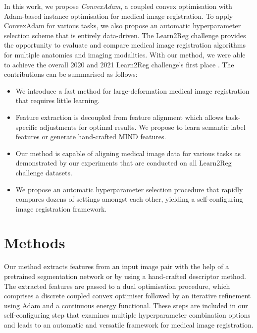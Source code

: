 In this work, we propose \textit{ConvexAdam}, a coupled convex optimisation with Adam-based instance optimisation for medical image registration. To apply ConvexAdam for various tasks, we also propose an automatic hyperparameter selection scheme that is entirely data-driven. The Learn2Reg challenge \citep{hering2022learn2reg} provides the opportunity to evaluate and compare medical image registration algorithms for multiple anatomies and imaging modalities. With our method, we were able to achieve the overall 2020 and 2021 Learn2Reg challenge's first place \citep{siebert2021fast,hering2022learn2reg}. The contributions can be summarised as follows:
\begin{itemize}
    \item We introduce a fast method for large-deformation medical image registration that requires little learning.
    \item Feature extraction is decoupled from feature alignment which allows task-specific adjustments for optimal results. We propose to learn semantic label features or generate hand-crafted MIND features.
    \item Our method is capable of aligning medical image data for various tasks as demonstrated by our experiments that are conducted on all Learn2Reg challenge datasets.
    \item We propose an automatic hyperparameter selection procedure that rapidly compares dozens of settings amongst each other, yielding a self-configuring image registration framework.
\end{itemize}

\section{Methods}
Our method extracts features from an input image pair with the help of a pretrained segmentation network or by using a hand-crafted descriptor method. The extracted features are passed to a dual optimisation procedure, which comprises a discrete coupled convex optimiser followed by an iterative refinement using Adam \citep{kingma2014adam} and a continuous energy functional. These steps are included in our self-configuring step that examines multiple hyperparameter combination options and leads to an automatic and versatile framework for medical image registration.

